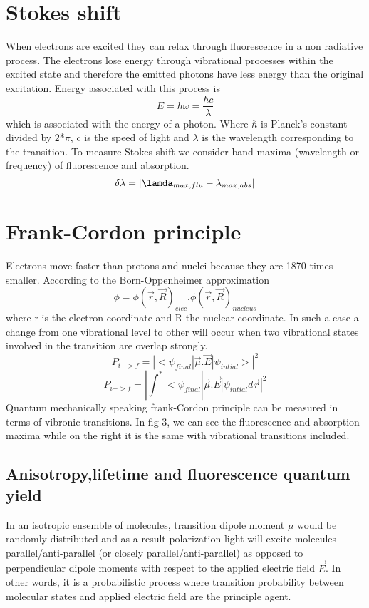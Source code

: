 \documentclass{article}
\begin{document}
\section{Stokes shift}
When electrons are excited they can relax through fluorescence in a non radiative process. The electrons lose energy through vibrational processes within the excited state and therefore the emitted photons have less energy than the original excitation. Energy associated with this process is
\begin{equation*}
    E = h\omega = \frac{\hbar c}{\lambda}
\end{equation*}
which is associated with the energy of a photon. Where $\hbar$ is Planck's constant divided by $2$*$\pi$, c is the speed of light and $\lambda$ is the wavelength corresponding to the transition. To measure Stokes shift we consider band maxima (wavelength or frequency) of fluorescence and absorption.
\begin{equation}
\delta \lambda = |\lamda_{max,flu} - \lambda_{max,abs}|
\end{equation}
\section{Frank-Cordon principle}
Electrons move faster than protons and nuclei because they are 1870 times smaller. According to the Born-Oppenheimer approximation
\begin{equation}
    \phi = \phi(\vec{r}, \vec{R})_{elec}. \phi(\vec{r}, \vec{R})_{nucleus}
\end{equation}
where r is the electron coordinate and R the nuclear coordinate. In such a case a change from one vibrational level to other will occur when two vibrational states involved in the transition are overlap strongly.
\begin{equation}
    P_{i->f} = |<\psi_{final}|\vec{\mu}.\vec{E}|\psi_{intial}>|^2
\end{equation}
\begin{equation}
    P_{i->f} = |\int_{}^{*}<\psi_{final}|\vec{\mu}.\vec{E}|\psi_{intial} d\vec{r}|^2
\end{equation}
Quantum mechanically speaking frank-Cordon principle can be measured in terms of vibronic transitions. In fig 3, we can see the fluorescence and absorption maxima while on the right it is the same with vibrational transitions included.

\subsection{Anisotropy,lifetime and fluorescence quantum yield}
In an isotropic ensemble of molecules, transition dipole moment $\mu$ would be randomly distributed and as a result polarization light will excite molecules parallel/anti-parallel (or closely parallel/anti-parallel) as opposed to perpendicular dipole moments with respect to the applied electric field $\vec{E}$. In other words, it is a probabilistic process where transition probability between molecular states and applied electric field are the principle agent. \\
\end{document}
